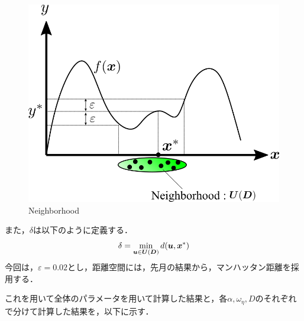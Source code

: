 \documentclass[16.7pt]{jsarticle}
\begin{document}
		\begin{figure}[h]
			\centering
			\includegraphics[width= 0.50\columnwidth]{./figure/Neighborhood2.png}
			\caption{Neighborhood}
		\end{figure}
		また，$ \delta $は以下のように定義する．
		\begin{equation}\label{eq:delta_eq}
			\delta = \min_{\boldsymbol{u} \in \boldsymbol{U}(\boldsymbol{D})} d(\boldsymbol{u},\boldsymbol{x}^*)
		\end{equation}
		今回は，$ \varepsilon = 0.02 $とし，距離空間には，先月の結果から，マンハッタン距離を採用する．
		
		これを用いて全体のパラメータを用いて計算した結果と，各$ \alpha,\omega_{\eta},D $のそれぞれで分けて計算した結果を，以下に示す．
		
\end{document}
